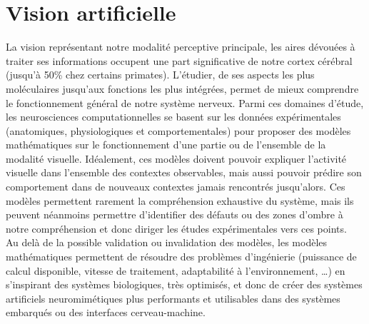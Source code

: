 
\section{Vision artificielle}
La vision représentant notre modalité perceptive principale, les aires dévouées à traiter ses informations occupent une part significative de notre cortex cérébral (jusqu'à 50\% chez certains primates). L'étudier, de ses aspects les plus moléculaires jusqu'aux fonctions les plus intégrées, permet de mieux comprendre le fonctionnement général de notre système nerveux.
Parmi ces domaines d'étude, les neurosciences computationnelles se basent sur les données expérimentales (anatomiques, physiologiques et comportementales) pour proposer des modèles mathématiques sur le fonctionnement d'une partie ou de l'ensemble de la modalité visuelle. Idéalement, ces modèles doivent pouvoir expliquer l'activité visuelle dans l'ensemble des contextes observables, mais aussi pouvoir prédire son comportement dans de nouveaux contextes jamais rencontrés jusqu'alors.
Ces modèles permettent rarement la compréhension exhaustive du système, mais ils peuvent néanmoins permettre d'identifier des défauts ou des zones d'ombre à notre compréhension et donc diriger les études expérimentales vers ces points. \autocite{Zhaoping2014} \\
Au delà de la possible validation ou invalidation des modèles, les modèles mathématiques permettent de résoudre des problèmes d'ingénierie (puissance de calcul disponible, vitesse de traitement, adaptabilité à l'environnement, \ldots) en s'inspirant des systèmes biologiques, très optimisés, et donc de créer des systèmes artificiels neuromimétiques plus performants et utilisables dans des systèmes embarqués ou des interfaces cerveau-machine. \autocite{Potthast2016} \\


